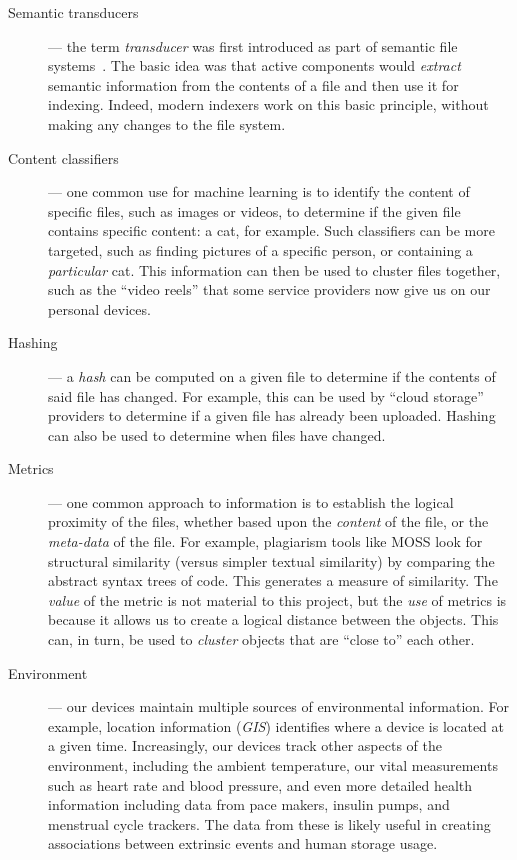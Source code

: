 \documentclass[sigconf,anonymous,review]{acmart}
\begin{document}
\begin{description}
    \item[Semantic transducers] --- the term \emph{transducer} was first
    introduced as part of semantic file systems~\cite{gifford1991semantic}.  The
    basic idea was that active components would \emph{extract} semantic
    information from the contents of a file and then use it for indexing.
    Indeed, modern indexers work on this basic principle, without making any
    changes to the file system.

    \item[Content classifiers] --- one common use for machine learning is to
    identify the content of specific files, such as images or videos, to
    determine if the given file contains specific content: a cat, for example.
    Such classifiers can be more targeted, such as finding pictures of a
    specific person, or containing a \emph{particular} cat.  This information
    can then be used to cluster files together, such as the ``video reels'' that
    some service providers now give us on our personal devices.

    \item[Hashing] --- a \emph{hash} can be computed on a given file to
    determine if the contents of said file has changed.  For example, this can
    be used by ``cloud storage'' providers to determine if a given file has
    already been uploaded.  Hashing can also be used to determine when files
    have changed.

    \item[Metrics] --- one common approach to information is to establish the
    logical proximity of the files, whether based upon the \emph{content} of the
    file, or the \emph{meta-data} of the file.  For example, plagiarism tools
    like MOSS look for structural similarity (versus simpler textual similarity)
    by comparing the abstract syntax trees of code.  This generates a measure of
    similarity.  The \emph{value} of the metric is not material to this project,
    but the \emph{use} of metrics is because it allows us to create a logical
    distance between the objects.  This can, in turn, be used to \emph{cluster}
    objects that are ``close to'' each other.

    \item[Environment] --- our devices maintain multiple sources of
    environmental information.  For example, location information (\emph{GIS})
    identifies where a device is located at a given time.  Increasingly, our
    devices track other aspects of the environment, including the ambient
    temperature, our vital measurements such as heart rate and blood pressure,
    and even more detailed health information including data from pace makers,
    insulin pumps, and menstrual cycle trackers.  The data from these is likely
    useful in creating associations between extrinsic events and human storage
    usage.


\end{description}
\end{document}
